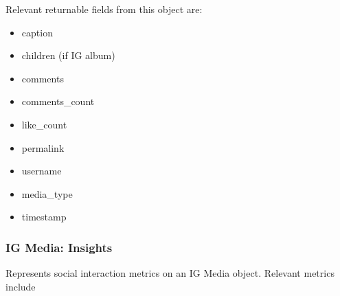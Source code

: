 Relevant returnable fields from this object are:
\begin{itemize}
    \item caption
    \item children (if IG album)
    \item comments
    \item comments\_count
    \item like\_count
    \item permalink
    \item username
    \item media\_type
    \item timestamp
\end{itemize}

\subsubsection{IG Media: Insights}
Represents social interaction metrics on an IG Media object. Relevant metrics include 
